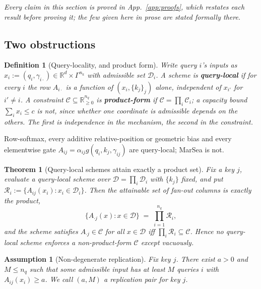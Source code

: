 \documentclass{article}
\newtheorem{theorem}{Theorem}
\newtheorem{definition}{Definition}
\newtheorem{assumption}{Assumption}
\begin{document}
\emph{Every claim in this section is proved in App.~\ref{app:proofs}, which restates each result
before proving it; the few given here in prose are stated formally there.}

\subsection{Two obstructions}

\begin{definition}[Query-locality, and product form]
\label{def:qlocal}
Write query $i$'s inputs as $x_i := (q_i,\gamma_{i\cdot}) \in \mathbb{R}^d\times\Gamma^{n_k}$
with admissible set $\mathcal{D}_i$. A scheme is \textbf{query-local} if for every $i$ the row
$A_{i\cdot}$ is a function of $(x_i,\{k_j\}_j)$ alone, independent of $x_{i'}$ for $i'\ne i$.
A constraint $\mathcal{C}\subseteq\mathbb{R}^{n_q}_{\ge0}$ is
\textbf{product-form} if $\mathcal{C}=\prod_i\mathcal{C}_i$; a capacity
bound $\sum_i x_i\le c$ is not, since whether one coordinate is admissible depends on the others.
The first is independence in the \emph{mechanism}, the second in the \emph{constraint}.
\end{definition}

Row-softmax, every additive relative-position or geometric bias and every elementwise gate
$A_{ij}=\alpha_{ij}g(q_i,k_j,\gamma_{ij})$ are query-local; MarSea is not.

\begin{theorem}[Query-local schemes attain exactly a product set]
\label{thm:separation}
Fix a key $j$, evaluate a query-local scheme over $\mathcal{D}=\prod_i\mathcal{D}_i$ with
$\{k_j\}$ fixed, and put $\mathcal{R}_i := \{A_{ij}(x_i) : x_i\in\mathcal{D}_i\}$. Then the
attainable set of fan-out columns is \emph{exactly} the product,
\begin{equation}
\big\{A_{\cdot j}(x) : x\in\mathcal{D}\big\} \;=\; \prod_{i=1}^{n_q}\mathcal{R}_i ,
\label{eq:product}
\end{equation}
and the scheme satisfies $A_{\cdot j}\in\mathcal{C}$ for all $x\in\mathcal{D}$ iff
$\prod_i\mathcal{R}_i\subseteq\mathcal{C}$. Hence no query-local scheme enforces a
non-product-form $\mathcal{C}$ except vacuously.
\end{theorem}

\begin{assumption}[Non-degenerate replication]
\label{ass:richness}
Fix key $j$. There exist $a>0$ and $M \le n_q$ such that some admissible input has at least $M$
queries $i$ with $A_{ij}(x_i)\ge a$. We call $(a,M)$ a \emph{replication pair} for key $j$.
\end{assumption}
\end{document}
